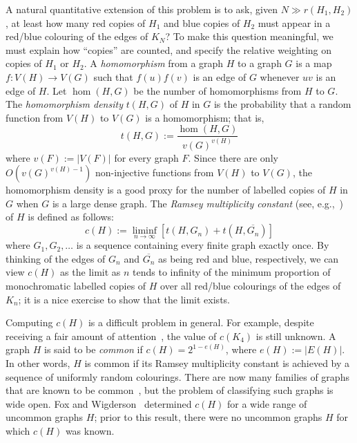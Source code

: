 \documentclass[12pt]{article}
\numberwithin{equation}{section}
\theoremstyle{definition}
\theoremstyle{remark}
\begin{document}
A natural quantitative extension of this problem is to ask, given $N\gg r(H_1,H_2)$, at least how many red copies of $H_1$ and blue copies of $H_2$ must appear in a red/blue colouring of the edges of $K_N$? To make this question meaningful, we must explain how ``copies'' are counted, and specify the relative weighting on copies of $H_1$ or $H_2$. A \emph{homomorphism} from a graph $H$ to a graph $G$ is a map $f:V(H)\to V(G)$ such that $f(u)f(v)$ is an edge of $G$ whenever $uv$ is an edge of $H$. Let $\hom(H,G)$ be the number of homomorphisms from $H$ to $G$. The \emph{homomorphism density} $t(H,G)$ of $H$ in $G$ is the probability that a random function from $V(H)$ to $V(G)$ is a homomorphism; that is,
\[t(H,G):=\frac{\hom(H,G)}{v(G)^{v(H)}}\]
where $v(F):=|V(F)|$ for every graph $F$. Since there are only $O\left(v(G)^{v(H)-1}\right)$ non-injective functions from $V(H)$ to $V(G)$, the homomorphism density is a good proxy for the number of labelled copies of $H$ in $G$ when $G$ is a large dense graph. The \emph{Ramsey multiplicity constant} (see, e.g.,~\cite{Fox08,Conlon12,GrzesikLeeLidickyVolec22,FoxWigderson23}) of $H$ is defined as follows:
\[c(H) := \liminf_{n\to\infty}\left[t(H,G_n)+ t(H,\overline{G_n})\right]\]
where $G_1,G_2,\dots$ is a sequence containing every finite graph exactly once. By thinking of the edges of $G_n$ and $\overline{G_n}$ as being red and blue, respectively, we can view $c(H)$ as the limit as $n$ tends to infinity of the minimum proportion of monochromatic labelled copies of $H$ over all red/blue colourings of the edges of $K_n$; it is a nice exercise to show that the limit exists. 

Computing $c(H)$ is a difficult problem in general. For example, despite receiving a fair amount of attention~\cite{EvenZoharLinial15,ParczykPokuttaSpiegelSzabo25,GrzesikLeeLidickyVolec22,Niess12,Sperfeld11,Thomason89,Thomason97}, the value of $c(K_4)$ is still unknown. A graph $H$ is said to be \emph{common} if $c(H)=2^{1-e(H)}$, where $e(H):=|E(H)|$. In other words, $H$ is common if its Ramsey multiplicity constant is achieved by a sequence of uniformly random colourings. There are now many families of graphs that are known to be common~\cite{Goodman59,Thomason89,Sidorenko89,Thomason97,JaggerStovicekThomason96,KralVolecWei25,Kral+22,BehagueMorrisonNoel24,GrzesikLeeLidickyVolec22,KoLee23,Hatami+12,LeeNoel26}, but the problem of classifying such graphs is wide open. Fox and Wigderson~\cite{FoxWigderson23} determined $c(H)$ for a wide range of uncommon graphs $H$; prior to this result, there were no uncommon graphs $H$ for which $c(H)$ was known. 
\end{document}
